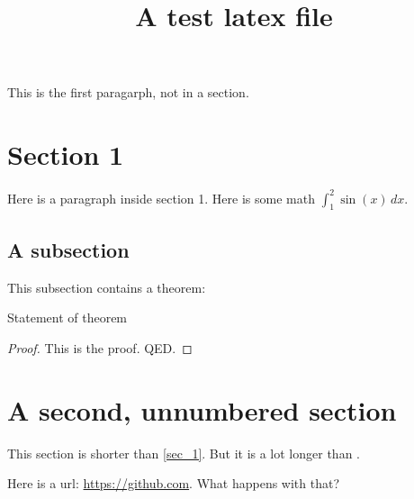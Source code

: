 \documentclass{article}
\begin{document}
\title{A test latex file}

This is the first paragarph, not in a section.

\section{Section 1}\label{sec-1}

Here is a paragraph inside section 1.  Here is some math $\int_1^2 \sin(x)\, dx$.

\subsection{A subsection}

This subsection contains a theorem:

\begin{theorem}\label{thm-1}
Statement of theorem
\end{theorem}

\begin{proof}
This is the proof.  QED.
\end{proof}

\section*{A second, unnumbered section}\label{sec-2}

This section is shorter than \ref{sec_1}.  But it is a lot longer than \cite{test-cite}.

Here is a url: \url{https://github.com}.  What happens with that?
\end{document}
